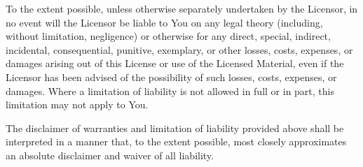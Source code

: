 \documentclass{article}
\begin{document}
To the extent possible, unless otherwise separately undertaken by the Licensor, in no event will the Licensor be liable to You on any legal theory (including, without limitation, negligence) or otherwise for any direct, special, indirect, incidental, consequential, punitive, exemplary, or other losses, costs, expenses, or damages arising out of this License or use of the Licensed Material, even if the Licensor has been advised of the possibility of such losses, costs, expenses, or damages. Where a limitation of liability is not allowed in full or in part, this limitation may not apply to You.

The disclaimer of warranties and limitation of liability provided above shall be interpreted in a manner that, to the extent possible, most closely approximates an absolute disclaimer and waiver of all liability.
\end{document}
